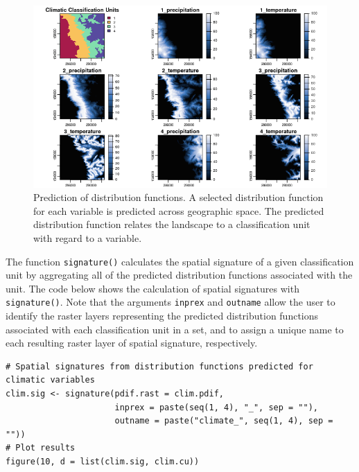 \begin{figure}[H]

{\centering \includegraphics[width=1\linewidth,height=0.35\textheight]{figures/figure_9} 

}

\caption{Prediction of distribution functions. A selected distribution function for each variable is predicted across geographic space. The predicted distribution function relates the landscape to a classification unit with regard to a variable.}\label{fig:f10}
\end{figure}

The function \texttt{signature()} calculates the spatial signature of a given
classification unit by aggregating all of the predicted distribution functions
associated with the unit. The code below shows the calculation of spatial
signatures with \texttt{signature()}. Note that the arguments \texttt{inprex} and \texttt{outname}
allow the user to identify the raster layers representing the predicted
distribution functions associated with each classification unit in a set, and to
assign a unique name to each resulting raster layer of spatial signature,
respectively.

\begin{verbatim}
# Spatial signatures from distribution functions predicted for climatic variables
clim.sig <- signature(pdif.rast = clim.pdif,
                      inprex = paste(seq(1, 4), "_", sep = ""),
                      outname = paste("climate_", seq(1, 4), sep = ""))
# Plot results
figure(10, d = list(clim.sig, clim.cu))
\end{verbatim}

